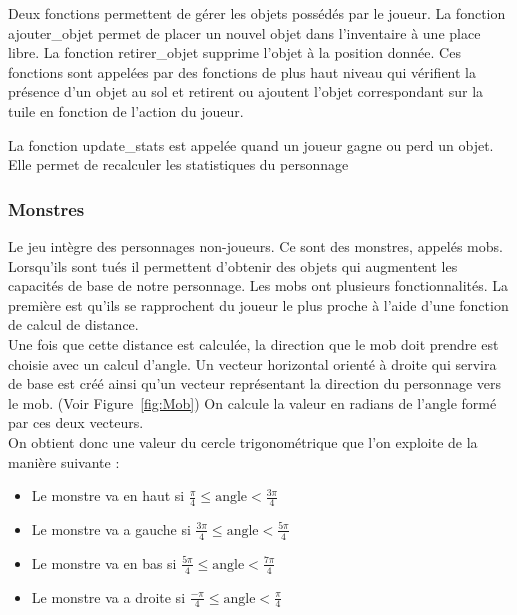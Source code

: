 \documentclass[11pt]{article}
\begin{document}
            Deux fonctions permettent de gérer les objets possédés par le joueur.
            La fonction ajouter\_objet permet de placer un nouvel objet dans l’inventaire à une place libre. La fonction retirer\_objet supprime l’objet à la position donnée.
            Ces fonctions sont appelées par des fonctions de plus haut niveau qui vérifient la présence d’un objet au sol et retirent ou ajoutent l’objet correspondant sur la tuile en fonction de l’action du joueur.

            La fonction update\_stats est appelée quand un joueur gagne ou perd un objet. Elle permet de recalculer les statistiques du personnage

            \subsubsection{Monstres}
            Le jeu intègre des personnages non-joueurs.
            Ce sont des monstres, appelés mobs. Lorsqu'ils sont tués il permettent d'obtenir des objets qui augmentent les capacités de base de notre personnage.
            Les mobs ont plusieurs fonctionnalités. La première est qu'ils se rapprochent du joueur le plus proche à l'aide d'une fonction de calcul de distance.
            \\
            Une fois que cette distance est calculée, la direction que le mob doit prendre est choisie avec un calcul d'angle. 
            Un vecteur horizontal orienté à droite qui servira de base est créé ainsi qu'un vecteur représentant la direction du personnage vers le mob. (Voir Figure~\ref{fig:Mob}) 
            On calcule la valeur en radians de l'angle formé par ces deux vecteurs.\\
            On obtient donc une valeur du cercle trigonométrique que l'on exploite de la manière suivante : 
            \begin{itemize}
                \item Le monstre va en haut si   $ \frac{\pi}{4}  \leq \text{angle} < \frac{3\pi}{4} $
                \item Le monstre va a gauche si  $ \frac{3\pi}{4} \leq \text{angle} < \frac{5\pi}{4} $
                \item Le monstre va en bas si    $ \frac{5\pi}{4} \leq \text{angle} < \frac{7\pi}{4} $
                \item Le monstre va a droite si  $ \frac{-\pi}{4} \leq \text{angle} < \frac{\pi}{4} $
            \end{itemize}
\end{document}
